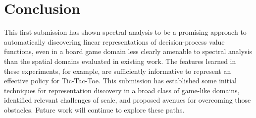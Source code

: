 \section{Conclusion}

This first submission has shown spectral analysis to be a promising approach to
automatically discovering linear representations of decision-process value
functions, even in a board game domain less clearly amenable to spectral
analysis than the spatial domains evaluated in existing work. The features
learned in these experiments, for example, are sufficiently informative to
represent an effective policy for Tic-Tac-Toe. This submission has established
some initial techniques for representation discovery in a broad class of
game-like domains, identified relevant challenges of scale, and proposed
avenues for overcoming those obstacles. Future work will continue to explore
these paths.

